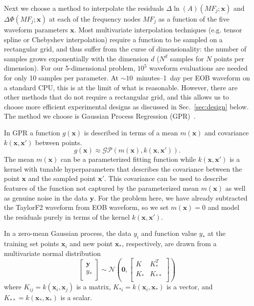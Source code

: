 \documentclass[prd,aps,letter,twocolumn,floatfix,notitlepage,nofootinbib]{revtex4-1}
\def\bx{\mathbf{x}}
\def\by{\mathbf{y}}
\begin{document}
Next we choose a method to interpolate the residuals $\Delta\ln(A)(MF_j; \bx)$ and $\Delta\Phi(MF_j; \bx)$ at each of the frequency nodes $MF_j$ as a function of the five waveform parameters $\bx$. Most multivariate interpolation techniques (e.g. tensor spline or Chebyshev interpolation) require a function to be sampled on a rectangular grid, and thus suffer from the curse of dimensionality: the number of samples grows exponentially with the dimension $d$ ($N^d$ samples for $N$ points per dimension). For our 5-dimensional problem, $10^5$ waveform evaluations are needed for only 10 samples per parameter. At $\sim10$~minutes--1~day per EOB waveform on a standard CPU, this is at the limit of what is reasonable. However, there are other methods that do not require a rectangular grid, and this allows us to choose more efficient experimental designs as discussed in Sec.~\ref{sec:design} below. The method we choose is Gaussian Process Regression (GPR)~\cite{RasmussenWilliams2006}.

In GPR a function $g(\bx)$ is described in terms of a mean $m(\bx)$ and  covariance $k(\bx, \bx')$ between points.
\begin{equation}
g(\bx) \approx \mathcal{GP}(m(\bx), k(\bx, \bx')).
\end{equation}
The mean $m(\bx)$ can be a parameterized fitting function while $k(\bx, \bx')$ is a kernel with tunable hyperparameters that describes the covariance between the point $\bx$ and the sampled point $\bx'$. This covariance can be used to describe features of the function not captured by the parameterized mean $m(\bx)$ as well as genuine noise in the data $\by$. For the problem here, we have already subtracted the TaylorF2 waveform from EOB waveform, so we set $m(\bx) = 0$ and model the residuals purely in terms of the kernel $k(\bx, \bx')$. 

In a zero-mean Gaussian process, the data $y_i$ and function value $y_*$ at the training set points $\bx_i$ and new point $\bx_*$, respectively, are drawn from a multivariate normal distribution
\begin{equation}
\label{eq:gaussian}
\begin{bmatrix}
{\bm y} \\
y_* \\
\end{bmatrix}
\sim \mathcal{N}
\left({\bm 0}, 
\begin{bmatrix}
K & K_*^T \\
K_* & K_{**} \\
\end{bmatrix}
\right)
\end{equation}
where $K_{ij} = k(\bx_i, \bx_j)$ is a matrix, $K_{*i} = k(\bx_i, \bx_*)$ is a vector, and $K_{**} = k(\bx_*, \bx_*)$ is a scalar.
\end{document}
